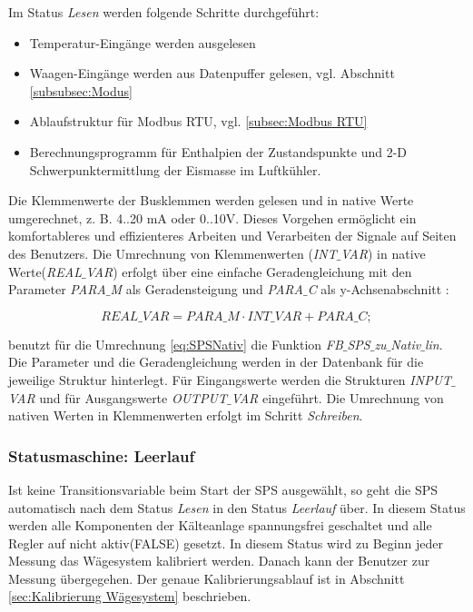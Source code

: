 Im Status \textit{Lesen} werden folgende Schritte durchgeführt: 

\begin{itemize}
\item	Temperatur-Eingänge werden ausgelesen
\item	Waagen-Eingänge werden aus Datenpuffer gelesen, vgl. Abschnitt \ref{subsubsec:Modus}
\item	Ablaufstruktur für Modbus RTU, vgl. \ref{subsec:Modbus RTU}
\item 	Berechnungsprogramm für Enthalpien der Zustandspunkte und 2-D Schwerpunktermittlung der Eismasse im Luftkühler.
\end{itemize} 

Die Klemmenwerte der Busklemmen werden gelesen und in native Werte umgerechnet, z. B. 4..20 mA oder 0..10V. Dieses Vorgehen ermöglicht ein komfortableres und effizienteres Arbeiten und Verarbeiten der Signale auf Seiten des Benutzers. Die Umrechnung von Klemmenwerten (\textit{INT$\_$VAR}) in native Werte(\textit{REAL$\_$VAR}) erfolgt über eine einfache Geradengleichung mit den Parameter \textit{PARA$\_$M} als Geradensteigung und \textit{PARA$\_$C} als y-Achsenabschnitt :

\begin{equation}
REAL\_VAR = PARA\_M\cdot INT\_VAR + PARA\_C; 
\label{eq:SPSNativ}
\end{equation}

\textsc{\citeauthor{Nuerenberg15}}  benutzt für die Umrechnung \ref{eq:SPSNativ} die Funktion \textit{FB$\_$SPS$\_$zu$\_$Nativ$\_$lin}. Die Parameter und die Geradengleichung werden in der Datenbank für die jeweilige Struktur hinterlegt. Für Eingangswerte werden die Strukturen \textit{INPUT$\_$VAR} und für Ausgangswerte \textit{OUTPUT$\_$VAR} eingeführt. Die Umrechnung von nativen Werten in Klemmenwerten erfolgt im Schritt \textit{Schreiben}.

\subsubsection*{Statusmaschine: Leerlauf}

Ist keine Transitionsvariable beim Start der SPS ausgewählt, so geht die SPS automatisch nach dem Status \textit{Lesen} in den Status \textit{Leerlauf} über. In diesem Status werden alle Komponenten der Kälteanlage spannungsfrei geschaltet und alle Regler auf nicht aktiv(FALSE) gesetzt. In diesem Status wird zu Beginn jeder Messung das Wägesystem kalibriert werden. Danach kann der Benutzer zur Messung übergegehen. Der genaue Kalibrierungsablauf ist in Abschnitt  \ref{sec:Kalibrierung Wägesystem} beschrieben. 

